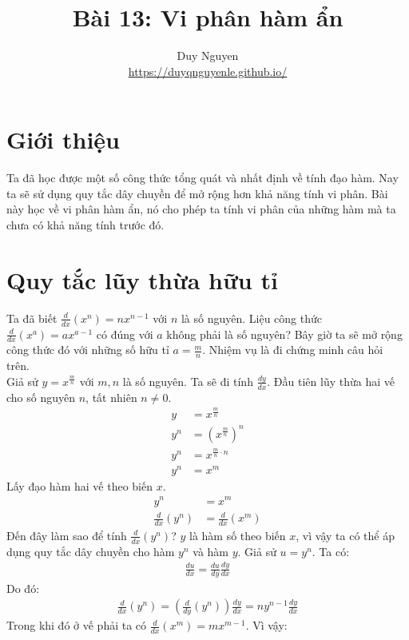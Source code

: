 \documentclass[15pt,a4paper]{article}
\begin{document}
\title{\textbf{Bài 13: Vi phân hàm ẩn}}
\author{Duy Nguyen\\
		\url{https://duyqnguyenle.github.io/}}
\date{}
\maketitle

\section{Giới thiệu}
Ta đã học được một số công thức tổng quát và nhất định về tính đạo hàm. Nay ta sẽ sử dụng quy tắc dây chuyền để mở rộng hơn khả năng tính vi phân. Bài này học về vi phân hàm ẩn, nó cho phép ta tính vi phân của những hàm mà ta chưa có khả năng tính trước đó.
\section{Quy tắc lũy thừa hữu tỉ}
Ta đã biết $\frac{d}{dx}(x^n)= n x^{n-1}$ với $n$ là số nguyên. Liệu công thức $\frac{d}{dx}(x^a)= ax^{a-1}$ có đúng với $a$ không phải là số nguyên? Bây giờ ta sẽ mở rộng công thức đó với những số hữu tỉ $a = \frac{m}{n}$. Nhiệm vụ là đi chứng minh câu hỏi trên.\\
Giả sử $y = x^{\frac{m}{n}}$ với $m, n$ là số nguyên. Ta sẽ đi tính $\frac{dy}{dx}$. Đầu tiên lũy thừa hai vế cho số nguyên $n$, tất nhiên $n \neq 0$.
\begin{align*}
	y &= x^{\frac{m}{n}}\\
	y^n &= (x^{\frac{m}{n}})^n\\
	y^n &= x^{\frac{m}{n} \cdot n}\\
	y^n &= x^m
\end{align*}
Lấy đạo hàm hai vế theo biến $x$.
\begin{align*}
	y^n &= x^m\\
	\frac{d}{dx}(y^n) &= \frac{d}{dx}(x^m)
\end{align*}
Đến đây làm sao để tính $\frac{d}{dx}(y^n)$? $y$ là hàm số theo biến $x$, vì vậy ta có thể áp dụng quy tắc dây chuyền cho hàm $y^n$ và hàm $y$. Giả sử $u = y^n$. Ta có:
\begin{align*}
	\frac{du}{dx} = \frac{du}{dy} \frac{dy}{dx}
\end{align*}
Do đó:
\begin{align*}
	\frac{d}{dx}(y^n) = \left(\frac{d}{dy}(y^n)\right) \frac{dy}{dx} = n y^{n-1} \frac{dy}{dx}
\end{align*}
Trong khi đó ở vế phải ta có $\frac{d}{dx}(x^m) = m x^{m-1}$. Vì vậy:
\end{document}
